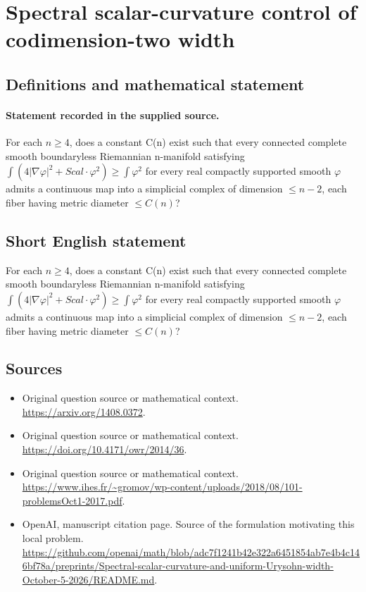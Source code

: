 \documentclass[11pt]{article}
\begin{document}
\section*{Spectral scalar-curvature control of codimension-two width}\label{30007159}
\subsection{Definitions and mathematical statement}
\paragraph{Statement recorded in the supplied source.}
For each $n\geq 4$, does a constant C(n) exist such that every connected complete smooth boundaryless Riemannian n-manifold satisfying $\int (4|\nabla \varphi |^{2}+Scal\cdot \varphi ^{2})\geq \int \varphi ^{2}$ for every real compactly supported smooth $\varphi $ admits a continuous map into a simplicial complex of dimension $\leq n-2$, each fiber having metric diameter $\leq C(n)$?
\subsection{Short English statement}
For each $n\geq 4$, does a constant C(n) exist such that every connected complete smooth boundaryless Riemannian n-manifold satisfying $\int (4|\nabla \varphi |^{2}+Scal\cdot \varphi ^{2})\geq \int \varphi ^{2}$ for every real compactly supported smooth $\varphi $ admits a continuous map into a simplicial complex of dimension $\leq n-2$, each fiber having metric diameter $\leq C(n)$?
\subsection{Sources}
\begin{itemize}
\item[S1] Original question source or mathematical context.
\url{https://arxiv.org/1408.0372}.
\item[S2] Original question source or mathematical context.
\url{https://doi.org/10.4171/owr/2014/36}.
\item[S3] Original question source or mathematical context.
\url{https://www.ihes.fr/~gromov/wp-content/uploads/2018/08/101-problemsOct1-2017.pdf}.
\item[S4] OpenAI, manuscript citation page. Source of the formulation motivating this local problem.
\url{https://github.com/openai/math/blob/adc7f1241b42e322a6451854ab7e4b4c146bf78a/preprints/Spectral-scalar-curvature-and-uniform-Urysohn-width-October-5-2026/README.md}.
\end{itemize}
\end{document}
